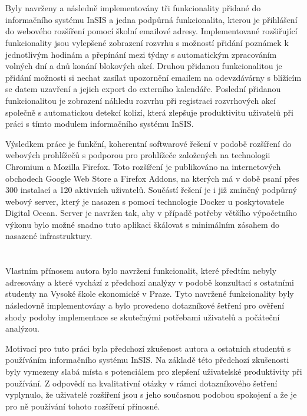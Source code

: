 \section*{\Vysledky}

Byly navrženy a následně implementovány tři funkcionality přidané do informačního systému InSIS a jedna podpůrná funkcionalita, kterou je přihlášení do webového rozšíření pomocí školní emailové adresy.  Implementované rozšiřující funkcionality jsou vylepšené zobrazení rozvrhu s možností přidání poznámek k jednotlivým hodinám a přepínání mezi týdny s automatickým zpracováním volných dní a dnů konání blokových akcí. Druhou přidanou funkcionalitou je přidání možnosti si nechat zasílat upozornění emailem na odevzdávárny s blížícím se datem uzavření a jejich export do externího kalendáře. Poslední přidanou funkcionalitou je zobrazení náhledu rozvrhu při registraci rozvrhových akcí společně s automatickou detekcí kolizí, která zlepšuje produktivitu uživatelů při práci s tímto modulem informačního systému InSIS.

Výsledkem práce je funkční, koherentní softwarové řešení v podobě rozšíření do webových prohlížečů s podporou pro prohlížeče založených na technologii Chromium a Mozilla Firefox. Toto rozšíření je publikováno na internetových obchodech Google Web Store a Firefox Addons, na kterých má v době psaní přes 300 instalací a 120 aktivních uživatelů. Součástí řešení je i již zmíněný podpůrný webový server, který je nasazen s pomocí technologie Docker u poskytovatele Digital Ocean. Server je navržen tak, aby v případě potřeby většího výpočetního výkonu bylo možné snadno tuto aplikaci škálovat s minimálním zásahem do nasazené infrastruktury.

\section*{\PrinosAutora}

Vlastním přínosem autora bylo navržení funkcionalit, které předtím nebyly adresovány a které vychází z předchozí analýzy v podobě konzultací s ostatními studenty na Vysoké škole ekonomické v Praze. Tyto navržené funkcionality byly následovně implementovány a bylo provedeno dotazníkové šetření pro ověření shody podoby implementace se skutečnými potřebami uživatelů a počáteční analýzou. 

Motivací pro tuto práci byla předchozí zkušenost autora a ostatních studentů s používáním informačního systému InSIS. Na základě této předchozí zkušenosti byly vymezeny slabá místa s potenciálem pro zlepšení uživatelské produktivity při používání. Z odpovědí na kvalitativní otázky v rámci dotazníkového šetření vyplynulo, že uživatelé rozšíření jsou s jeho současnou podobou spokojení a že je pro ně používání tohoto rozšíření přínosné.

